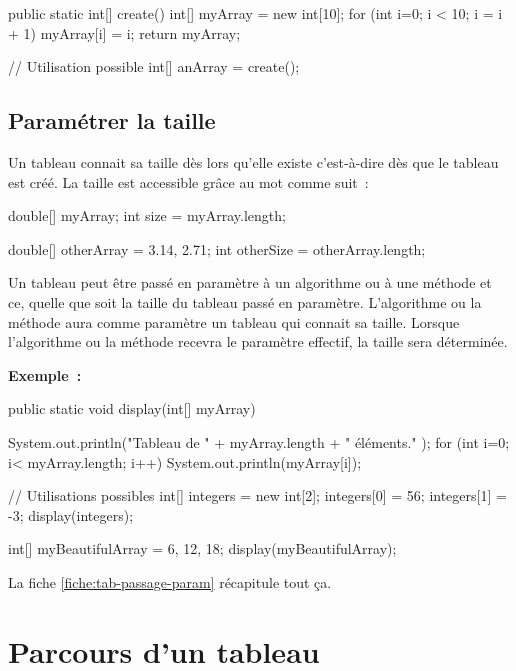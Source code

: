 \begin{java}
	public static int[] create(){
		int[] myArray = new int[10];
		for (int i=0; i < 10; i = i + 1){
			myArray[i] = i;
		}
		return myArray;
	}


	// Utilisation possible
	int[] anArray = create();
\end{java}

		\subsection{Paramétrer la taille}
		
		Un tableau connait sa taille dès lors qu'elle existe c'est-à-dire dès
		que le tableau est créé. La taille est accessible grâce au mot
		 comme suit~:

		\begin{java}
			double[] myArray;
			int size = myArray.length;

			double[] otherArray = {3.14, 2.71};
			int otherSize = otherArray.length;
		\end{java}

		Un tableau peut être passé en paramètre à un algorithme ou à une méthode
		et ce, quelle que soit la taille du tableau passé en paramètre.
		L'algorithme ou la méthode aura comme paramètre un tableau qui connait
		sa taille. Lorsque l'algorithme ou la méthode recevra le paramètre
		effectif, la taille sera déterminée. 
		
		\textbf{Exemple~:}

		\begin{java}
public static void display(int[] myArray){
	System.out.println("Tableau de " 
		+ myArray.length 
		+ " éléments." );
	for (int i=0; i< myArray.length; i++){
		System.out.println(myArray[i]);
	}

	// Utilisations possibles
	int[] integers = new int[2];
	integers[0] = 56;
	integers[1] = -3;
	display(integers);
	
	int[] myBeautifulArray = {6, 12, 18};
	display(myBeautifulArray);
}
		\end{java}

		La fiche \vref{fiche:tab-passage-param} récapitule tout ça.

	\section{Parcours d’un tableau} 
	\label{Les parcours de tableaux}

